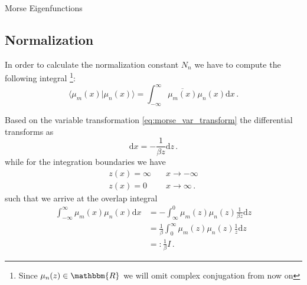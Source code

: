 \begin{chapter}{Morse Eigenfunctions}
\begin{figure}[h!]
\end{figure}



\subsection{Normalization} %
\label{sub:Normalization}

In order to calculate the normalization constant $N_n$ we have to compute the following integral
\footnote{Since $\mu_n(z)\in\mathbbm{R}$ we will omit complex conjugation from now on}:
\begin{equation}
  \langle \mu_{m}(x) | \mu_{n}(x) \rangle = \int_{-\infty}^{\infty} \overline{\mu_{m}(x)} \mu_{n}(x) \mathrm{d}x \,.
\end{equation}

Based on the variable transformation \eqref{eq:morse_var_transform} the differential transforms as
\begin{equation}
  \mathrm{d}x = -\frac{1}{\beta z} \mathrm{d}z \,.
\end{equation}
while for the integration boundaries we have
\begin{equation}
  \begin{split}
    z(x) = \infty & \quad x \rightarrow -\infty \\
    z(x) = 0 & \quad x \rightarrow \infty  \,.
  \end{split}
\end{equation}
such that we arrive at the overlap integral
\begin{equation}
  \label{eq:overlap}
  \begin{split}
    \int_{-\infty}^{\infty} \mu_{m}(x) \mu_{n}(x) \mathrm{d}x
    & = - \int_{\infty}^{0} \mu_{m}(z) \mu_{n}(z) \frac{1}{\beta z} \mathrm{d}z \\
    & = \frac{1}{\beta} \int_{0}^{\infty} \mu_{m}(z) \mu_{n}(z) \frac{1}{z} \mathrm{d}z \\
    & =: \frac{1}{\beta} I \,.
  \end{split}
\end{equation}


\end{chapter}
